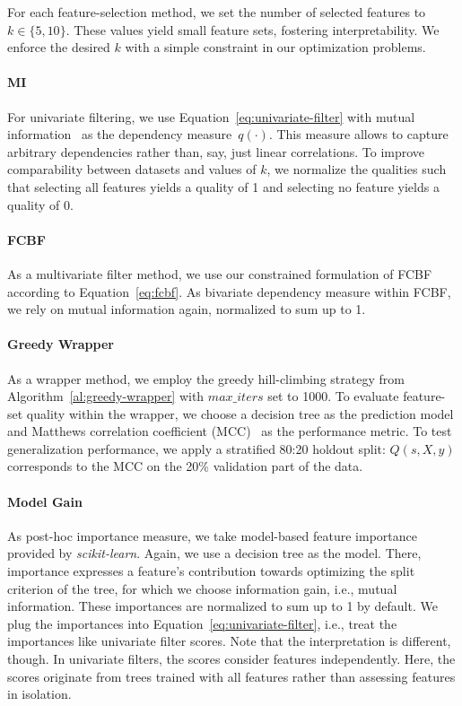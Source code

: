 \documentclass{article}
\theoremstyle{definition}
\begin{document}
For each feature-selection method, we set the number of selected features to $k \in \{5,10\}$.
These values yield small feature sets, fostering interpretability.
We enforce the desired $k$ with a simple constraint in our optimization problems.

\paragraph{MI}

For univariate filtering, we use Equation~\ref{eq:univariate-filter} with mutual information~\cite{kraskov2004estimating} as the dependency measure~$q(\cdot)$.
This measure allows to capture arbitrary dependencies rather than, say, just linear correlations.
To improve comparability between datasets and values of $k$, we normalize the qualities such that selecting all features yields a quality of 1 and selecting no feature yields a quality of 0.

\paragraph{FCBF}

As a multivariate filter method, we use our constrained formulation of FCBF~\cite{yu2003feature} according to Equation~\ref{eq:fcbf}.
As bivariate dependency measure within FCBF, we rely on mutual information again, normalized to sum up to 1.

\paragraph{Greedy Wrapper}

As a wrapper method, we employ the greedy hill-climbing strategy from Algorithm~\ref{al:greedy-wrapper} with $max\_iters$ set to 1000.
To evaluate feature-set quality within the wrapper, we choose a decision tree as the prediction model and Matthews correlation coefficient (MCC)~\cite{matthews1975comparison} as the performance metric.
To test generalization performance, we apply a stratified 80:20 holdout split:
$Q(s,X,y)$ corresponds to the MCC on the 20\% validation part of the data.

\paragraph{Model Gain}

As post-hoc importance measure, we take model-based feature importance provided by \emph{scikit-learn}.
Again, we use a decision tree as the model.
There, importance expresses a feature's contribution towards optimizing the split criterion of the tree, for which we choose information gain, i.e., mutual information.
These importances are normalized to sum up to 1 by default.
We plug the importances into Equation~\ref{eq:univariate-filter}, i.e., treat the importances like univariate filter scores.
Note that the interpretation is different, though.
In univariate filters, the scores consider features independently.
Here, the scores originate from trees trained with all features rather than assessing features in isolation.
\end{document}
